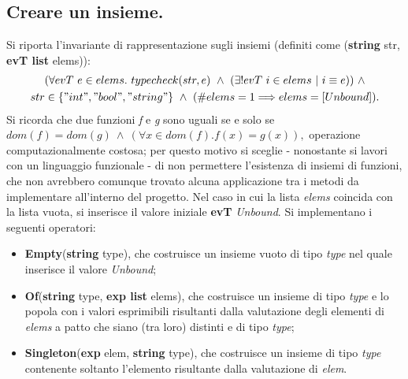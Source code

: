 \documentclass[10pt, italian, openany]{book}
\begin{document}
\subsection*{Creare un insieme.}
Si riporta l'invariante di rappresentazione sugli insiemi (definiti come (\textbf{string} str, \textbf{evT list} elems)):
\begin{gather*}
(\forall evT \ e \in elems. \ typecheck(str,e) \ \wedge \ (\exists! evT \ i  \in elems \ | \ i \equiv e))  \ \wedge \\
str \in \{"int", "bool", "string"\} \ \wedge \ (\#elems = 1\Longrightarrow elems=[Unbound]).
\end{gather*}
Si ricorda che due funzioni \textit{f} e \textit{g} sono uguali se e solo se \( dom(f) = dom(g) \ \wedge \ (\forall x \in dom(f). f(x) = g(x)), \) operazione computazionalmente costosa; per questo motivo si sceglie - nonostante si lavori con un linguaggio funzionale - di non permettere l'esistenza di insiemi di funzioni, che non avrebbero comunque trovato alcuna applicazione tra i metodi da implementare all'interno del progetto.
Nel caso in cui la lista \textit{elems} coincida con la lista vuota, si inserisce il valore iniziale \textbf{evT} \textit{Unbound}.
Si implementano i seguenti operatori:
\begin{itemize}
\item \textbf{Empty}(\textbf{string} type), che costruisce un insieme vuoto di tipo \textit{type} nel quale inserisce il valore \textit{Unbound};
\item \textbf{Of}(\textbf{string} type, \textbf{exp list} elems), che costruisce un insieme di tipo \textit{type} e lo popola con i valori esprimibili risultanti dalla valutazione degli elementi di \textit{elems} a patto che siano (tra loro) distinti e di tipo \textit{type};
\item \textbf{Singleton}(\textbf{exp} elem, \textbf{string} type), che costruisce un insieme di tipo \textit{type} contenente soltanto l'elemento risultante dalla valutazione di \textit{elem}.
\end{itemize}
\end{document}
